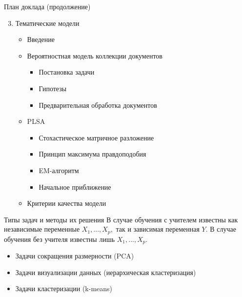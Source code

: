 \documentclass{beamer}
\begin{document}
\begin{frame}{План доклада (продолжение)}
\begin{enumerate}
\setcounter{enumi}{2}
    \item Тематические модели 
    \begin{itemize}
        \item Введение
        \item Вероятностная модель коллекции документов
        \begin{itemize}
            \item Постановка задачи
            \item Гипотезы
            \item Предварительная обработка документов
        \end{itemize}
        \item PLSA
        \begin{itemize}
            \item Стохастическое матричное разложение
            \item Принцип максимума правдоподобия
            \item EM-алгоритм
            \item Начальное приближение
        \end{itemize}
        \item Критерии качества модели
    \end{itemize}
\end{enumerate}
\end{frame}


\begin{frame}{Типы задач и методы их решения}
    В случае обучения с учителем известны как независимые переменные $X_{1}, ... , X_{p},$ так и зависимая переменная $Y$. В случае обучения без учителя известны лишь $X_{1}, ... , X_{p}$. 
    
    \begin{itemize}
    
    \item Задачи сокращения размерности (PCA)
    
    \item Задачи визуализации данных (иерархическая кластеризация)

    \item Задачи кластеризации (k-means)
    
    \end{itemize}
    \end{frame}
\end{document}
